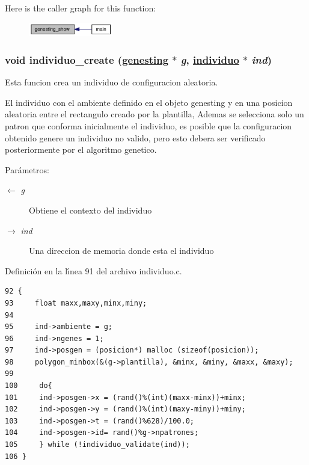 Here is the caller graph for this function:\begin{figure}[H]
\begin{center}
\leavevmode
\includegraphics[width=104pt]{group__genetic_g3f63f4034274d731cb3fdf3200c64d41_g3f63f4034274d731cb3fdf3200c64d41_icgraph}
\end{center}
\end{figure}
\hypertarget{group__genetic_gf4e60223d27c85a5f6166e35ecafe641_gf4e60223d27c85a5f6166e35ecafe641}{
\subsubsection[individuo\_\-create]{\setlength{\rightskip}{0pt plus 5cm}void individuo\_\-create (\hyperlink{struct__genesting}{genesting} $\ast$ {\em g}, \hyperlink{struct__individuo}{individuo} $\ast$ {\em ind})}}
\label{group__genetic_gf4e60223d27c85a5f6166e35ecafe641_gf4e60223d27c85a5f6166e35ecafe641}


Esta funcion crea un individuo de configuracion aleatoria.

El individuo con el ambiente definido en el objeto genesting y en una posicion aleatoria entre el rectangulo creado por la plantilla, Ademas se selecciona solo un patron que conforma inicialmente el individuo, es posible que la configuracion obtenido genere un individuo no valido, pero esto debera ser verificado posteriormente por el algoritmo genetico.

\begin{Desc}
\item[Par\'{a}metros:]
\begin{description}
\item[\mbox{$\leftarrow$} {\em g}]Obtiene el contexto del individuo \item[\mbox{$\rightarrow$} {\em ind}]Una direccion de memoria donde esta el individuo \end{description}
\end{Desc}


Definici\'{o}n en la l\'{\i}nea 91 del archivo individuo.c.

\begin{Code}\begin{verbatim}92 {
93     float maxx,maxy,minx,miny;
94 
95     ind->ambiente = g;
96     ind->ngenes = 1;
97     ind->posgen = (posicion*) malloc (sizeof(posicion));
98     polygon_minbox(&(g->plantilla), &minx, &miny, &maxx, &maxy);
99 
100     do{
101     ind->posgen->x = (rand()%(int)(maxx-minx))+minx;
102     ind->posgen->y = (rand()%(int)(maxy-miny))+miny;
103     ind->posgen->t = (rand()%628)/100.0;
104     ind->posgen->id= rand()%g->npatrones;
105     } while (!individuo_validate(ind));
106 }
\end{verbatim}\end{Code}




